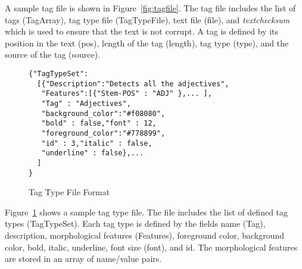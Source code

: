 A sample tag file is shown in Figure~\ref{fig:tagfile}. 
The tag file includes the list of tags (TagArray), tag type file (TagTypeFile), 
text file (file), and {\em textchecksum} which is used to ensure that the 
text is not corrupt. 
A tag is defined by its position in the text (pos), length of the tag (length), 
tag type (type), and the source of the tag (source).

\begin{figure}[h*]
\begingroup
    \fontsize{8pt}{12pt}\selectfont
\begin{verbatim}
{"TagTypeSet":
  [{"Description":"Detects all the adjectives",
   "Features":[{"Stem-POS" : "ADJ" },... ],
   "Tag" : "Adjectives",
   "background_color":"#f08080",
   "bold" : false,"font" : 12,
   "foreground_color":"#778899",
   "id" : 3,"italic" : false,
   "underline" : false},...
  ]
}
\end{verbatim}
\endgroup
\caption{Tag Type File Format}
\label{fig:tagtypefile}
\end{figure}

Figure~\ref{fig:tagtypefile} shows a sample tag type file. 
The file includes the list of defined tag types (TagTypeSet). 
Each tag type is defined by the fields name (Tag), description, 
morphological features (Features), foreground color, 
background color, bold, italic, underline, font size (font), and id. 
The morphological features are stored in an array of name/value pairs.